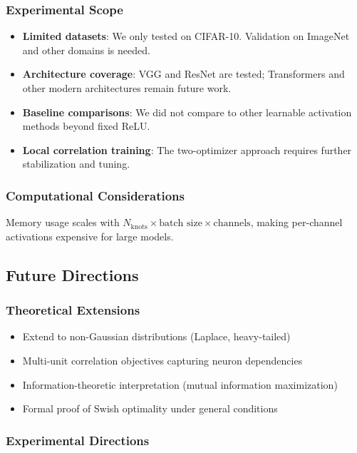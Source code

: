 \documentclass{article}
\begin{document}
\subsubsection{Experimental Scope}

\begin{itemize}
\item \textbf{Limited datasets}: We only tested on CIFAR-10. Validation on ImageNet and other domains is needed.
\item \textbf{Architecture coverage}: VGG and ResNet are tested; Transformers and other modern architectures remain future work.
\item \textbf{Baseline comparisons}: We did not compare to other learnable activation methods beyond fixed ReLU.
\item \textbf{Local correlation training}: The two-optimizer approach requires further stabilization and tuning.
\end{itemize}

\subsubsection{Computational Considerations}

Memory usage scales with $N_{\text{knots}} \times \text{batch size} \times \text{channels}$, making per-channel activations expensive for large models.

\subsection{Future Directions}

\subsubsection{Theoretical Extensions}

\begin{itemize}
\item Extend to non-Gaussian distributions (Laplace, heavy-tailed)
\item Multi-unit correlation objectives capturing neuron dependencies
\item Information-theoretic interpretation (mutual information maximization)
\item Formal proof of Swish optimality under general conditions
\end{itemize}

\subsubsection{Experimental Directions}
\end{document}

